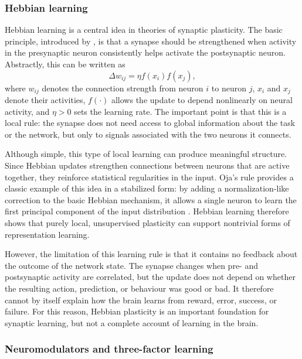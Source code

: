 \subsubsection{Hebbian learning}

Hebbian learning is a central idea in theories of synaptic plasticity. The basic principle, introduced by \textcite{hebb_organization_1949}, is that a synapse should be strengthened when activity in the presynaptic neuron consistently helps activate the postsynaptic neuron. Abstractly, this can be written as
\[
\Delta w_{ij}
=
\eta f(x_i) f(x_j),
\]
where \(w_{ij}\) denotes the connection strength from neuron \(i\) to neuron \(j\), \(x_i\) and \(x_j\) denote their activities, \(f(\cdot)\) allows the update to depend nonlinearly on neural activity, and \(\eta>0\) sets the learning rate. The important point is that this is a local rule: the synapse does not need access to global information about the task or the network, but only to signals associated with the two neurons it connects.

Although simple, this type of local learning can produce meaningful structure. Since Hebbian updates strengthen connections between neurons that are active together, they reinforce statistical regularities in the input. Oja's rule provides a classic example of this idea in a stabilized form: by adding a normalization-like correction to the basic Hebbian mechanism, it allows a single neuron to learn the first principal component of the input distribution \parencite{oja_simplified_1982}. Hebbian learning therefore shows that purely local, unsupervised plasticity can support nontrivial forms of representation learning.

However, the limitation of this learning rule is that it contains no feedback about the outcome of the network state. The synapse changes when pre- and postsynaptic activity are correlated, but the update does not depend on whether the resulting action, prediction, or behaviour was good or bad. It therefore cannot by itself explain how the brain learns from reward, error, success, or failure. For this reason, Hebbian plasticity is an important foundation for synaptic learning, but not a complete account of learning in the brain.
\subsubsection{Neuromodulators and three-factor learning}

